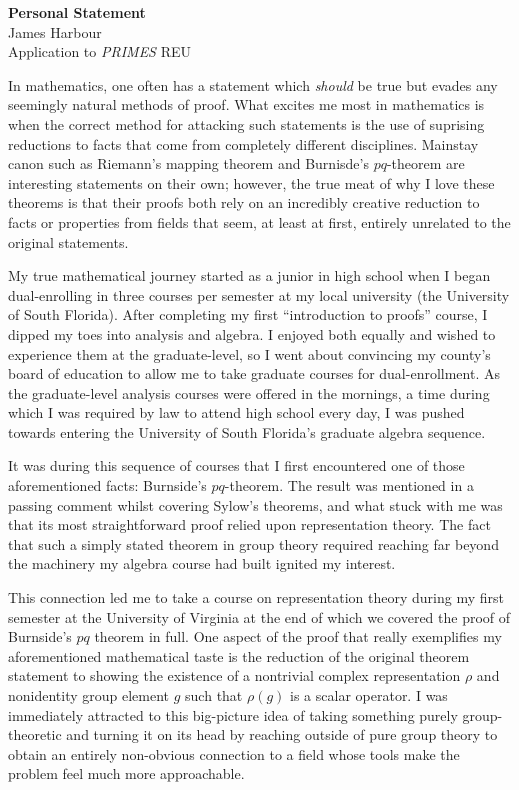 \documentclass[11pt]{article}
\begin{document}
\begin{center}
  \textbf{Personal Statement}\\
  James Harbour \\
  Application to \emph{PRIMES} REU
\end{center}

In mathematics, one often has a statement which \emph{should} be true but evades any seemingly natural methods of proof. What excites me most in mathematics is when the correct method for attacking such statements is the use of suprising reductions to facts that come from completely different disciplines. Mainstay canon such as Riemann's mapping theorem and Burnisde's $pq$-theorem are interesting statements on their own; however, the true meat of why I love these theorems is that their proofs both rely on an incredibly creative reduction to facts or properties from fields that seem, at least at first, entirely unrelated to the original statements.

My true mathematical journey started as a junior in high school when I began dual-enrolling in three courses per semester at my local university (the University of South Florida). After completing my first ``introduction to proofs'' course, I dipped my toes into analysis and algebra. I enjoyed both equally and wished to experience them at the graduate-level, so I went about convincing my county's board of education to allow me to take graduate courses for dual-enrollment. As the graduate-level analysis courses were offered in the mornings, a time during which I was required by law to attend high school every day, I was pushed towards entering the University of South Florida's graduate algebra sequence.

It was during this sequence of courses that I first encountered one of those aforementioned facts: Burnside's $pq$-theorem. The result was mentioned in a passing comment whilst covering Sylow's theorems, and what stuck with me was that its most straightforward proof relied upon representation theory. The fact that such a simply stated theorem in group theory required reaching far beyond the machinery my algebra course had built ignited my interest.

This connection led me to take a course on representation theory during my first semester at the University of Virginia at the end of which we covered the proof of Burnside's $pq$ theorem in full. One aspect of the proof that really exemplifies my aforementioned mathematical taste is the reduction of the original theorem statement to showing the existence of a nontrivial complex representation $\rho$ and nonidentity group element $g$ such that $\rho(g)$ is a scalar operator. I was immediately attracted to this big-picture idea of taking something purely group-theoretic and turning it on its head by reaching outside of pure group theory to obtain an entirely non-obvious connection to a field whose tools make the problem feel much more approachable.
\end{document}
